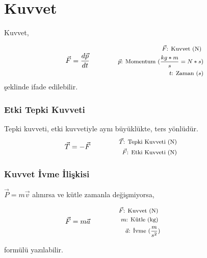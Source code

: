\section{Kuvvet}

Kuvvet,

\begin{equation}
    \vec{F} = \frac{d\vec{p}}{dt} \qquad \qquad \parbox{4cm}{\footnotesize$
    \begin{aligned}
        \vec{F}\text{: Kuvvet (N) } \\
        \vec{p}\text{: Momentum } (\frac{kg*m}{s} = N*s) \\
        t\text{: Zaman } (s)
    \end{aligned}$
    }
\end{equation}
şeklinde ifade edilebilir.

\subsubsection*{Etki Tepki Kuvveti}
Tepki kuvveti, etki kuvvetiyle aynı büyüklükte, ters yönlüdür.
\begin{equation}
    \vec{T} = -\vec{F} \qquad \qquad \parbox{4cm}{\footnotesize$\begin{aligned}
        \vec{T}\text{: Tepki Kuvveti (N) } \\
        \vec{F}\text{: Etki Kuvveti (N) }
\end{aligned}$}
\end{equation}

\subsubsection*{Kuvvet İvme İlişkisi}

$\vec{P} = m\vec{v}$ alınırsa ve kütle zamanla değişmiyorsa,

\begin{equation}
    \vec{F} = m\vec{a} \qquad \qquad \parbox{4cm}{\footnotesize$\begin{aligned}
        \vec{F}\text{: Kuvvet (N) } \\
        m\text{: Kütle (kg) } \\
        \vec{a}\text{: İvme } (\frac{m}{s^2})
    \end{aligned}$}
\end{equation}

formülü yazılabilir.

